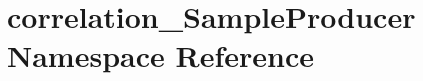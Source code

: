 \hypertarget{namespacecorrelation__SampleProducer}{
\section{correlation\_\-SampleProducer Namespace Reference}
\label{namespacecorrelation__SampleProducer}
}
